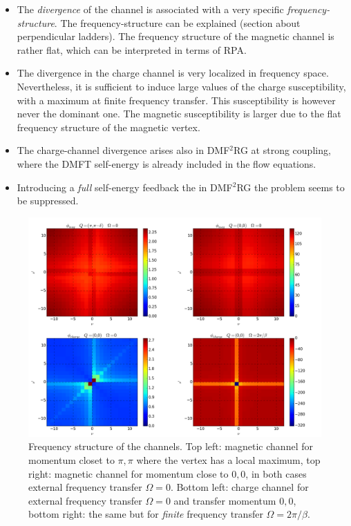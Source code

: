 \begin{itemize}
\item The \textit{divergence} of the channel is associated with a very specific \textit{frequency-structure}. The frequency-structure can be explained (section about perpendicular ladders). 
The frequency structure of the magnetic channel is rather flat, which can be interpreted in terms of RPA.
 
 \item The divergence in the charge channel is very localized in frequency space. 
Nevertheless, it is sufficient to induce large values of the charge susceptibility,  with a maximum at finite frequency transfer. This susceptibility is however never the dominant one. 
The magnetic susceptibility is larger due to the flat frequency structure of the magnetic vertex. 
 
\item The charge-channel divergence arises also in DMF$^2$RG at strong coupling, where the DMFT self-energy is already included in the flow equations.

\item Introducing a \emph{full} self-energy feedback the in DMF$^2$RG the problem seems to be suppressed. 

     
\end{itemize} 
 
\begin{figure}
\includegraphics[scale=0.3]{images/Merged_tpri0105.png}
\caption{Frequency structure of the channels. Top left: magnetic channel for momentum closet to $\pi,\pi$ where the vertex has a local maximum, top right: magnetic channel for momentum close to $0,0$, in both cases external frequency transfer $\Omega=0$. 
Bottom left: charge channel for external frequency transfer $\Omega=0$ and transfer momentum $0,0$, bottom right: the same but for \emph{finite} frequency transfer $\Omega = 2\pi/\beta$. } 
\label{structurechargefrg} 
\end{figure}
